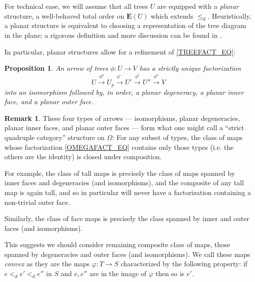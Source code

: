 \documentclass[a4paper,10pt
,draft
]{article}%
\numberwithin{equation}{section}
\numberwithin{figure}{section}
\newtheorem{proposition}[equation]{Proposition}%
\theoremstyle{definition} %
\newtheorem{remark}[equation]{Remark}%
\newcommand{\1}{\ensuremath{\mathbbm 1}}%
\begin{document}
For technical ease, we will assume that all trees $U$ are equipped with a \textit{planar} structure,
a well-behaved total order on $\boldsymbol{E}(U)$ which extends $\leq_d$.
Heuristically, a planar structure is equivalent to choosing a  representation of the tree diagram in the plane;
a rigorous definition and more discussion can be found in \cite[\S 3.1]{BP_geo}.

In particular, planar structures allow for a refinement of \eqref{TREEFACT_EQ}:
\begin{proposition}
      An arrow of trees $\phi \colon U \to V$ has a strictly unique factorization
      \begin{equation}
            \label{OMEGAFACT_EQ}
            U \xrightarrow{\phi^p} U_p \xrightarrow{\phi^-} U' \xrightarrow{\phi^i} U'' \xrightarrow{\phi^o} V            
      \end{equation}
      into an isomorphism followed by, in order,
      a planar degeneracy, a planar inner face, and a planar outer face.
\end{proposition}

\begin{remark}
      These four types of arrows
      --- isomorphisms, planar degeneracies, planar inner faces, and planar outer faces ---
      form what one might call a ``strict quadruple category'' structure on $\Omega$:
      For any subset of types,
      the class of maps whose factorization \eqref{OMEGAFACT_EQ} contains only those types (i.e. the others are the identity)
      is closed under composition.
      
      For example, the class of tall maps is precisely the class of maps spanned by inner faces and degeneracies (and isomorphisms),
      and the composite of any tall map is again tall,
      and so in particular will never have a factorization containing a non-trivial outer face.

      Similarly, the class of face maps is precisely the class spanned by inner and outer faces (and isomorphisms).

      This suggests we should consider remaining composite class of maps,
      those spanned by degeneracies and outer faces (and isomorphisms).
      We call these maps \textit{convex}
      as they are the maps $\varphi \colon T \to S$
      characterized by the following property:
      if $e <_d e' <_d e''$
      in $S$ and $e,e''$ are in the image of $\varphi$
      then so is $e'$.
\end{remark}
\end{document}
